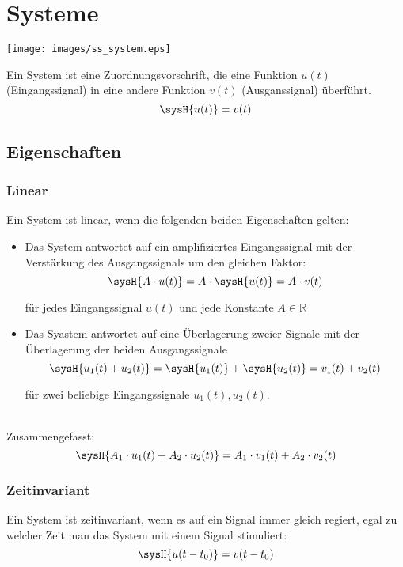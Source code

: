 



\section{Systeme}
\begin{center}
	\texttt{[image: images/ss\_system.eps]}
\end{center}
Ein System ist eine Zuordnungsvorschrift, die eine Funktion $u(t)$ (Eingangssignal) in eine andere Funktion $v(t)$ (Ausganssignal) überführt.
\[
	\sysH{u(t)} = v(t)
\]

\subsection{Eigenschaften}
\subsubsection{Linear}
Ein System ist linear, wenn die folgenden beiden Eigenschaften gelten:
\begin{itemize}
	\item Das System antwortet auf ein amplifiziertes Eingangssignal mit der Verstärkung des Ausgangssignals um den gleichen Faktor:
	\[
		\sysH{A \cdot u(t)}= A \cdot \sysH{u(t)} = A \cdot v(t)
	\]
	\begin{footnotesize}
		für jedes Eingangssignal $u(t)$ und jede Konstante $A \in \mathbb{R}$\\
	\end{footnotesize}
	\item Das Syastem antwortet auf eine Überlagerung zweier Signale mit der Überlagerung der beiden Ausgangssignale
	\[
		\sysH{u_1(t) + u_2(t)} = \sysH{u_1(t)} + \sysH{u_2(t)} = v_1(t) + v_2(t)
	\]
	\begin{footnotesize}
		für zwei beliebige Eingangssignale $u_1(t),u_2(t)$.\\\\
	\end{footnotesize}
\end{itemize}
Zusammengefasst:
\[
	\sysH{A_1 \cdot u_1(t) + A_2 \cdot u_2(t)} = A_1 \cdot v_1(t) + A_2 \cdot v_2(t)
\]

\subsubsection{Zeitinvariant}
Ein System ist zeitinvariant, wenn es auf ein Signal immer gleich regiert, egal zu welcher Zeit man das System mit einem Signal stimuliert:
\[
	\sysH{u(t-t_0)} = v(t-t_0)
\]